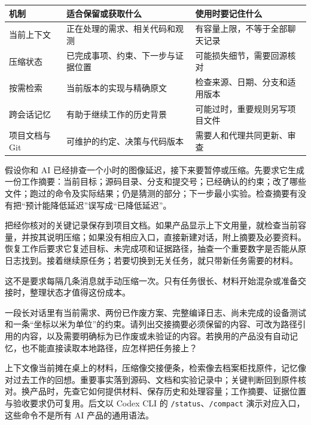 \begin{center}
\begin{tabular}{p{}p{}p{}}
\toprule
机制 & 适合保留或获取什么 & 使用时要记住什么 \\
\midrule
当前上下文 & 正在处理的需求、相关代码和观测 & 有容量上限，不等于全部聊天记录 \\
压缩状态 & 已完成事项、约束、下一步与证据位置 & 可能损失细节，需要回源核对 \\
按需检索 & 当前版本的实现与精确原文 & 检查来源、日期、分支和适用版本 \\
跨会话记忆 & 有助于继续工作的历史背景 & 可能过时，重要规则另写项目文件 \\
项目文档与 Git & 可维护的约定、决策与代码版本 & 需要人和代理共同更新、审查 \\
\bottomrule
\end{tabular}
\end{center}

\begin{example}[长任务中途换班]
假设你和 AI 已经排查一个小时的图像延迟，接下来要暂停或压缩。先要求它生成一份工作摘要：当前目标；源码目录、分支和提交号；已经确认的约束；改了哪些文件；跑过的命令及实际结果；仍是猜测的部分；下一步最小实验。检查摘要有没有把“预计能降低延迟”误写成“已降低延迟”。

把经你核对的关键记录保存到项目文档。如果产品显示上下文用量，就检查当前容量，并按其说明压缩；如果没有相应入口，直接新建对话，附上摘要及必要资料。恢复工作后要求它复述目标、未完成项和证据路径，抽查一个重要数字是否能从原日志找到。接着继续原任务；若要切换到无关任务，就只带新任务需要的材料。

这不是要求每隔几条消息就手动压缩一次。只有任务很长、材料开始混杂或准备交接时，整理状态才值得这份成本。
\end{example}

\begin{exercise}\label{ex:ai-principle-context}
一段长对话里有当前需求、两份已作废方案、完整编译日志、尚未完成的设备测试和一条“坐标以米为单位”的约束。请列出交接摘要必须保留的内容、可改为路径引用的内容，以及需要明确标为已作废或未验证的内容。若换用的产品没有自动记忆，也不能直接读取本地路径，应怎样把任务接上？
\end{exercise}

\begin{conclusion}
上下文像当前摊在桌上的材料，压缩像交接便条，检索像去档案柜找原件，记忆像对过去工作的回想。重要事实落到源码、文档和实验记录中；关键判断回到原件核对。换产品时，先查它如何提供材料、保存历史和处理容量；工作摘要、证据位置与验收要求仍可复用。后文以 Codex CLI 的 \texttt{/status}、\texttt{/compact} 演示对应入口，这些命令不是所有 AI 产品的通用语法。
\end{conclusion}
